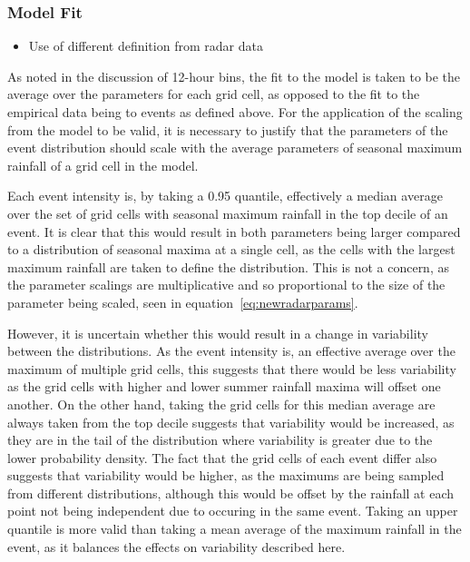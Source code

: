 \subsubsection{Model Fit}
\begin{itemize}\item Use of different definition from radar data\end{itemize}

As noted in the discussion of 12-hour bins,
    the fit to the model is taken to be the average over the parameters for each grid cell,
    as opposed to the fit to the empirical data being to events as defined above.
For the application of the scaling from the model to be valid,
     it is necessary to justify that the parameters of the event distribution should scale with
    the average parameters of seasonal maximum rainfall of a grid cell in the model.

Each event intensity is,
    by taking a 0.95 quantile,
    effectively a median average over the set of grid cells with seasonal maximum rainfall in the top decile of an event.
It is clear that this would result in both parameters being larger compared to a distribution of seasonal maxima at a single cell,
    as the cells with the largest maximum rainfall are taken to define the distribution.
This is not a concern,
    as the parameter scalings are multiplicative and so proportional to the size of the parameter being scaled,
    seen in equation~\ref{eq:newradarparams}.

However,
    it is uncertain whether this would result in a change in variability between the distributions.
As the event intensity is,
    an effective average over the maximum of multiple grid cells,
    this suggests that there would be less variability as the grid cells with higher and lower summer rainfall maxima will offset one another.
On the other hand,
    taking the grid cells for this median average are always taken from the top decile suggests
    that variability would be increased, as they are in the tail of the distribution where variability is greater
    due to the lower probability density.
The fact that the grid cells of each event differ also suggests that variability would be higher,
    as the maximums are being sampled from different distributions,
    although this would be offset by the rainfall at each point not being independent due to occuring in the same event.
Taking an upper quantile is more valid than taking a mean average of the maximum rainfall in the event,
    as it balances the effects on variability described here.

